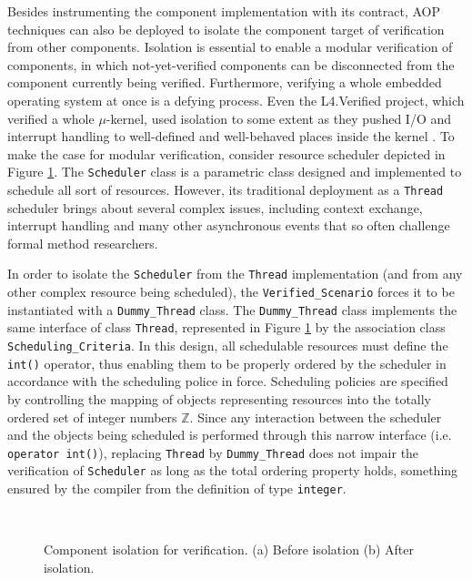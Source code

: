 \documentclass{sig-alternate}
\newcommand{\multfigtwov}[6][htb]{
\begin{figure}[#1]
  \centering
  \subfloat[]{\label{fig:#3}\scalebox{#2}{\texttt{[image: fig/\#3]}}}\\
  \subfloat[]{\label{fig:#4}\scalebox{#2}{\texttt{[image: fig/\#4]}}}
  \caption{#6}
  \label{fig:#5}
\end{figure}
}
\begin{document}
Besides instrumenting the component implementation with its contract,
AOP techniques can also be deployed to isolate the component target of
verification from other components.  Isolation is essential to enable a
modular verification of components, in which not-yet-verified components
can be disconnected from the component currently being verified.
Furthermore, verifying a whole embedded operating system at once is a
defying process. Even the L4.Verified project, which verified a whole
$\mu$-kernel, used isolation to some extent as they pushed I/O and
interrupt handling to well-defined and well-behaved places inside the
kernel \cite{Klein:2009}.  To make the case for modular verification,
consider resource scheduler depicted in Figure
\ref{fig:component_isolation_for_verification-all}. The
\texttt{Scheduler} class is a parametric class designed and implemented
to schedule all sort of resources. However, its traditional deployment
as a \texttt{Thread} scheduler brings about several complex issues,
including context exchange, interrupt handling and many other
asynchronous events that so often challenge formal method researchers.

In order to isolate the \texttt{Scheduler} from the \texttt{Thread}
implementation (and from any other complex resource being scheduled),
the \texttt{Verified\_Scenario} forces it to be instantiated with a
\texttt{Dummy\_Thread} class. The \texttt{Dummy\_Thread} class
implements the same interface of class \texttt{Thread}, represented in
Figure \ref{fig:component_isolation_for_verification-all} by the
association class \texttt{Scheduling\_Cri\-te\-ria}.  In this design,
all schedulable resources must define the \texttt{int()} operator, thus
enabling them to be properly ordered by the scheduler in accordance with
the scheduling police in force. Scheduling policies are specified by
controlling the mapping of objects representing resources into the
totally ordered set of integer numbers $\mathbb{Z}$. Since any
interaction between the scheduler and the objects being scheduled is
performed through this narrow interface (i.e. \texttt{operator int()}),
replacing \texttt{Thread} by \texttt{Dummy\_Thread} does not impair the
verification of \texttt{Scheduler} as long as the total ordering
property holds, something ensured by the compiler from the definition of
type \texttt{integer}.

\multfigtwov{.4}{component_isolation_for_verification-a}{component_isolation_for_verification-b}
{component_isolation_for_verification-all} {Component isolation for
  verification. (a) Before isolation (b) After isolation.}
\end{document}
